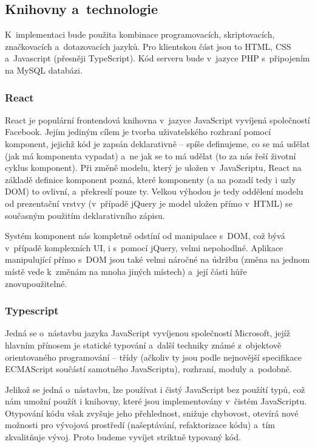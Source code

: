 \subsection{Knihovny a~technologie}
K~implementaci bude použita kombinace programovacích, skriptovacích, značkovacích a~dotazovacích jazyků. Pro klientskou část jsou to HTML, CSS a~Javascript (přesněji TypeScript). Kód serveru bude v~jazyce PHP s~připojením na MySQL databázi.


\subsubsection{React}
React je populární frontendová knihovna v~jazyce JavaScript vyvíjená společností Facebook. Jejím jediným cílem je tvorba uživatelského rozhraní pomocí komponent, jejichž kód je zapsán deklarativně -- spíše definujeme, co se má udělat (jak má komponenta vypadat) a~ne jak se to má udělat (to za nás řeší životní cyklus komponent). Při změně modelu, který je uložen v~JavaScriptu, React na základě definice komponent pozná, které komponenty (a na pozadí tedy i uzly DOM) to ovlivní, a~překreslí pouze ty. Velkou výhodou je tedy oddělení modelu od prezentační vrstvy (v~případě jQuery je model uložen přímo v~HTML) se současným použitím deklarativního zápisu.

Systém komponent nás kompletně odstíní od manipulace s~DOM, což bývá v~případě komplexních UI, i s~pomocí jQuery, velmi nepohodlné. Aplikace manipulující přímo s~DOM jsou také velmi náročné na údržbu (změna na jednom místě vede k~změnám na mnoha jiných místech) a~její části hůře znovupoužitelné.


\subsubsection{Typescript}
Jedná se o~nástavbu jazyka JavaScript vyvíjenou společností Microsoft, jejíž hlavním přínosem je statické typování a~další techniky známé z~objektově orientovaného programování -- třídy (ačkoliv ty jsou podle nejnovější specifikace ECMAScript součástí samotného JavaScriptu), rozhraní, moduly a~podobně.

Jelikož se jedná o~nástavbu, lze používat i čistý JavaScript bez použítí typů, což nám umožní použít i knihovny, které jsou implementovány v~čistém JavaScriptu. Otypování kódu však zvyšuje jeho přehlednost, snižuje chybovost, otevírá nové možnosti pro vývojová prostředí (našeptávání, refaktorizace kódu) a~tím zkvalitňuje vývoj. Proto budeme vyvíjet striktně typovaný kód. 


